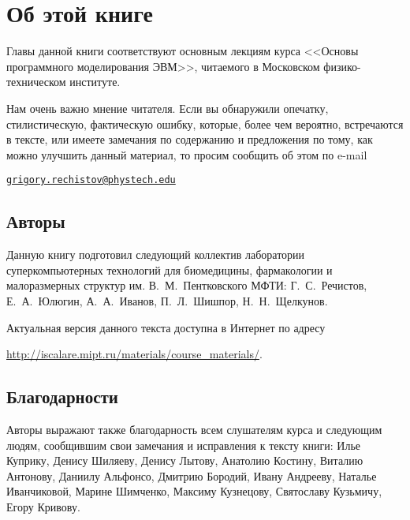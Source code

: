 \chapter*{Об этой книге}\label{chap:contrib}

Главы данной книги соответствуют основным лекциям курса <<Основы программного моделирования ЭВМ>>, читаемого в Московском физико-техническом институте.

Нам очень важно мнение читателя. Если вы обнаружили опечатку, стилистическую, фактическую ошибку, которые, более чем вероятно, встречаются в тексте, или имеете замечания по содержанию и предложения по тому, как можно улучшить данный материал, то просим сообщить об этом по e-mail 

\begin{center}
\href{mailto:grigory.rechistov@phystech.edu}{\texttt{grigory.rechistov@phystech.edu}}
\end{center}


\section*{Авторы}

Данную книгу подготовил следующий коллектив лаборатории суперкомпьютерных технологий для биомедицины, фармакологии и малоразмерных структур им. В.~М.~Пентковского МФТИ: Г.~С.~Речистов, Е.~А.~Юлюгин, А.~А.~Иванов, П.~Л.~Шишпор, Н.~Н.~Щелкунов.

Актуальная версия данного текста доступна в Интернет по адресу

\url{http://iscalare.mipt.ru/materials/course_materials/}.

\section*{Благодарности}

Авторы выражают также благодарность всем слушателям курса и следующим людям, сообщившим свои замечания и исправления к тексту книги: Илье Куприку, Денису Шиляеву, Денису Лытову, Анатолию Костину, Виталию Антонову, Даниилу Альфонсо, Дмитрию Бородий, Ивану Андрееву, Наталье Иванчиковой, Марине Шимченко, Максиму Кузнецову, Святославу Кузьмичу, Егору Кривову.


